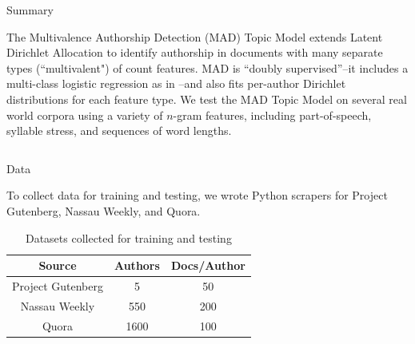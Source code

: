 \documentclass[final]{beamer}
\newlength{\onecolwid}
\newlength{\twocolwid}
\begin{document}
\begin{frame}[t]
\begin{columns}[t]
\begin{column}{\twocolwid}

\begin{alertblock}{Summary}

The Multivalence Authorship Detection (MAD) Topic Model extends Latent Dirichlet Allocation \citep{Blei2003} to identify authorship in documents with many separate types (``multivalent") of count features. MAD is ``doubly supervised''--it includes a multi-class logistic regression as in \cite{Blei2007}--and also fits per-author Dirichlet distributions for each feature type. We test the MAD Topic Model on several real world corpora using a variety of $n$-gram features, including part-of-speech, syllable stress, and sequences of word lengths.
\end{alertblock} 


\begin{columns}[t,totalwidth=\twocolwid] %

\begin{column}{\onecolwid} %


\begin{block}{Data}

To collect data for training and testing, we wrote Python scrapers for Project Gutenberg, Nassau Weekly, and Quora. 

\vspace{5 mm}

\begin{table}[ht] 
\caption{Datasets collected for training and testing}
\centering
\begin{tabular}{ c | c | c }
  Source & Authors & Docs/Author \\
  \hline
  Project Gutenberg & 5 & 50 \\
  Nassau Weekly & 550 & 200 \\
  Quora & 1600 & 100 \\
\end{tabular}
\end{table}


\end{block}
\end{column}
\end{columns}
\end{column}
\end{columns}
\end{frame}
\end{document}
